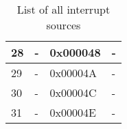 \begin{table}[h]
\begin{tabular}{|l|l|l|l|}
        28                  & -                   & 0x000048        & -                              \\ \hline
        29                  & -                   & 0x00004A        & -                              \\ \hline
        30                  & -                   & 0x00004C        & -                              \\ \hline
        31                  & -                   & 0x00004E        & -                              \\ \hline
    \end{tabular}
    \caption{List of all interrupt sources}
    \label{tab:intsources}
\end{table}


